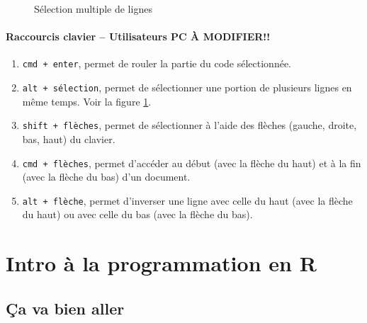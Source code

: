 \documentclass[10.5pt,a4paper]{article}
\begin{document}
      \begin{figure}[H]
      \centering
      \caption{Sélection multiple de lignes}
      \label{altSelect}
      \end{figure}
      
      \paragraph{Raccourcis clavier -- Utilisateurs PC À MODIFIER!!}
      \begin{enumerate}
        \item \texttt{cmd + enter}, permet de rouler la partie du code sélectionnée.
        \item \texttt{alt + sélection}, permet de sélectionner une portion de plusieurs lignes en même temps. Voir la figure \ref{altSelect}.
        \item \texttt{shift + flèches}, permet de sélectionner à l'aide des flèches (gauche, droite, bas, haut) du clavier.
        \item \texttt{cmd + flèches}, permet d'accéder au début (avec la flèche du haut) et à la fin (avec la flèche du bas) d'un document.
        \item \texttt{alt + flèche}, permet d'inverser une ligne avec celle du haut (avec la flèche du haut) ou avec celle du bas (avec la flèche du bas).
      \end{enumerate}

\section{Intro à la programmation en R}
  \subsection{Ça va bien aller}
\end{document}

